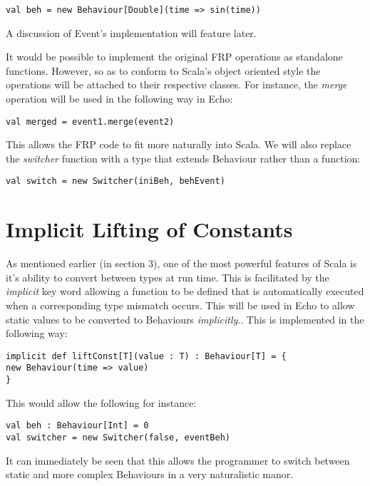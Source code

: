 \begin{verbatim}
val beh = new Behaviour[Double](time => sin(time))
\end{verbatim}  

    A discussion of Event's implementation will feature later.
    
    It would be possible to implement the original FRP operations as standalone functions. However, so
    as to conform to Scala's object oriented style the operations will be attached to their respective
    classes. For instance, the \emph{merge} operation will be used in the following way in Echo:
    
\begin{verbatim}
val merged = event1.merge(event2)
\end{verbatim}

  This allows the FRP code to fit more naturally into Scala. We will also replace the \emph{switcher} function
  with a type that extends Behaviour rather than a function:
  
\begin{verbatim}
val switch = new Switcher(iniBeh, behEvent)
\end{verbatim}

  \section{Implicit Lifting of Constants}
    As mentioned earlier (in section 3), one of the most powerful features of Scala is it's ability to convert between
    types at run time. This is facilitated by the \emph{implicit} key word allowing a function to be defined
    that is automatically executed when a corresponding type mismatch occurs. This will be used in Echo to allow 
    static values to be converted to Behaviours \emph{implicitly}.. This is implemented in the following way:  

\begin{verbatim}
implicit def liftConst[T](value : T) : Behaviour[T] = {
new Behaviour(time => value)
}
\end{verbatim}              
    
    This would allow the following for instance:

\begin{verbatim}
val beh : Behaviour[Int] = 0
val switcher = new Switcher(false, eventBeh)
\end{verbatim}       

    It can immediately be seen that this allows the programmer to switch between static and more complex
    Behaviours in a very naturalistic manor.
    
